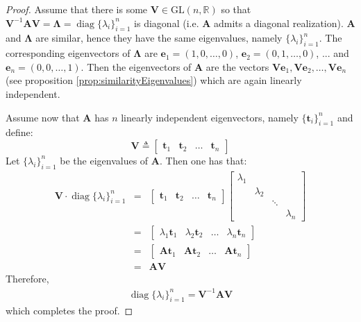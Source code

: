 \documentclass[a4paper,10pt,oneside]{book}
\begin{document}
\begin{proof}
 Assume that there is some $\mathbf{V}\in \text{GL}(n,\mathbb{R})$ so that $\mathbf{V}^{-1}\mathbf{AV}=\mathbf{\Lambda}=\operatorname{diag}\{\lambda_i\}_{i=1}^{n}$ is diagonal (i.e. $\mathbf{A}$ admits a diagonal realization). $\mathbf{A}$ and $\mathbf{\Lambda}$ are similar, hence they have the same eigenvalues, namely $\{\lambda_i\}_{i=1}^{n}$. 
The corresponding eigenvectors of $\mathbf{\Lambda}$ are $\mathbf{e}_1=(1,0,\ldots,0)$, $\mathbf{e}_2=(0,1,\ldots,0)$, ... and $\mathbf{e}_n=(0,0,\ldots,1)$. 
Then the eigenvectors of $\mathbf{A}$ are the vectors $\mathbf{Ve}_1,\mathbf{Ve}_2,\ldots,\mathbf{Ve}_n$ (see proposition \ref{prop:similarityEigenvalues}) which are again linearly independent.

 Assume now that $\mathbf{A}$ has $n$ linearly independent eigenvectors, namely $\{\mathbf{t}_i\}_{i=1}^n$ and define:
\begin{equation}
 \mathbf{V}\triangleq\left[ {\begin{array}{cccc} \mathbf{t}_1 & \mathbf{t}_2 & \ldots & \mathbf{t}_n\end{array} } \right] 
\end{equation}
Let $\{\lambda_i\}_{i=1}^n$ be the eigenvalues of $\mathbf{A}$. Then one has that:
\begin{eqnarray}
 \mathbf{V}\cdot\operatorname{diag}\{\lambda_i\}_{i=1}^n &=& \left[ {\begin{array}{cccc} \mathbf{t}_1 & \mathbf{t}_2 & \ldots & \mathbf{t}_n\end{array} } \right] \left[ {\begin{array}{cccc} \lambda_1 &&&\\
 & \lambda_2 &&\\
 && \ddots &\\
 &&& \lambda_n \end{array} } \right] \\
 &=&\left[ {\begin{array}{cccc} \lambda_1\mathbf{t}_1 & \lambda_2\mathbf{t}_2 & \ldots & \lambda_n\mathbf{t}_n\end{array} } \right]\\
 &=&\left[ {\begin{array}{cccc} \mathbf{At}_1 & \mathbf{At}_2 & \ldots & \mathbf{At}_n\end{array} } \right]\\
 &=& \mathbf{AV}
\end{eqnarray}
Therefore,
\begin{eqnarray}
 \operatorname{diag}\{\lambda_i\}_{i=1}^n = \mathbf{V}^{-1}\mathbf{AV}
\end{eqnarray}
which completes the proof.
\end{proof}
\end{document}
